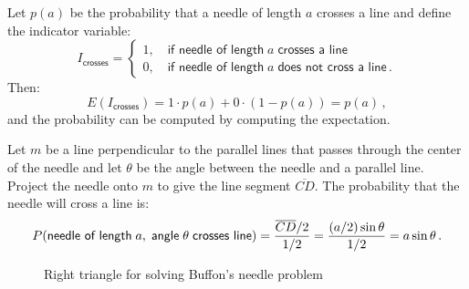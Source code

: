 Let $p(a)$ be the probability that a needle of length $a$ crosses a line and define the indicator variable:
\[
I_{\textsf{crosses}}=
\left\{
\begin{array}{ll}
1,\quad \textsf{if needle of length}\;a\;\textsf{crosses a line}\\
0, \quad \textsf{if needle of length}\;a\;\textsf{does not cross a line}\,.
\end{array}
\right.
\]
Then:
\begin{equation}\label{eq.buffon-probability}
E(I_{\textsf{crosses}})=1\cdot p(a) + 0\cdot (1-p(a))=p(a)\,,
\end{equation}
and the probability can be computed by computing the expectation.

Let $m$ be a line perpendicular to the parallel lines that passes through the center of the needle and let $\theta$ be the angle between the needle and a parallel line. Project the needle onto $m$ to give the line segment $\overline{CD}$. The probability that the needle will cross a line is:
\begin{equation}\label{eq.cross}
P(\textsf{needle of length}\;a,\;\textsf{angle}\;\theta\;\textsf{crosses line})=\displaystyle\frac{\overline{CD}/2}{1/2}=\displaystyle\frac{(a/2)\sin \theta}{1/2}=a\sin\theta\,.
\end{equation}

\begin{figure}[bt]
\begin{center}
\end{center}
\caption{Right triangle for solving Buffon's needle problem}\label{f.buffon2}
\end{figure}

